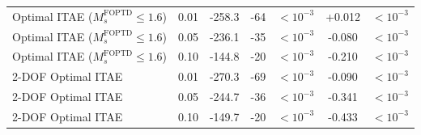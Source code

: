 \begin{table}[t]
{\begin{tabular}{lcccccc}
Optimal ITAE ($M_s^{\mathrm{FOPTD}} \leq 1.6$) & 0.01 & -258.3 & -64 & $<10^{-3}$ & +0.012 & $<10^{-3}$ \\
Optimal ITAE ($M_s^{\mathrm{FOPTD}} \leq 1.6$) & 0.05 & -236.1 & -35 & $<10^{-3}$ & -0.080 & $<10^{-3}$ \\
Optimal ITAE ($M_s^{\mathrm{FOPTD}} \leq 1.6$) & 0.10 & -144.8 & -20 & $<10^{-3}$ & -0.210 & $<10^{-3}$ \\
2-DOF Optimal ITAE & 0.01 & -270.3 & -69 & $<10^{-3}$ & -0.090 & $<10^{-3}$ \\
2-DOF Optimal ITAE & 0.05 & -244.7 & -36 & $<10^{-3}$ & -0.341 & $<10^{-3}$ \\
2-DOF Optimal ITAE & 0.10 & -149.7 & -20 & $<10^{-3}$ & -0.433 & $<10^{-3}$ \\
\bottomrule
\end{tabular}%
}
\end{table}
